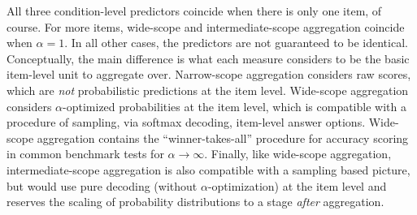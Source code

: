 \documentclass[fleqn]{article}
\begin{document}
All three condition-level predictors coincide when there is only one item, of course.
For more items, wide-scope and intermediate-scope aggregation coincide when $\alpha = 1$.
In all other cases, the predictors are not guaranteed to be identical.
Conceptually, the main difference is what each measure considers to be the basic item-level unit to aggregate over.
Narrow-scope aggregation considers raw scores, which are \emph{not} probabilistic predictions at the item level.
Wide-scope aggregation considers $\alpha$-optimized probabilities at the item level, which is compatible with a procedure of sampling, via softmax decoding, item-level answer options.
Wide-scope aggregation contains the ``winner-takes-all'' procedure for accuracy scoring in common benchmark tests for $\alpha \rightarrow \infty$.
Finally, like wide-scope aggregation, intermediate-scope aggregation is also compatible with a sampling based picture, but would use pure decoding (without $\alpha$-optimization) at the item level and reserves the scaling of probability distributions to a stage \emph{after} aggregation.
\end{document}
